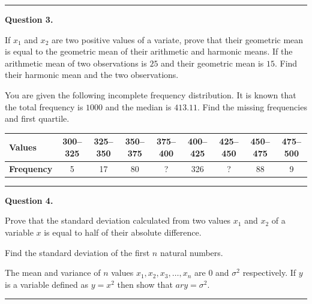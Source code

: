 \documentclass[11pt,a4paper]{article}
\begin{document}
\medskip\rule{\linewidth}{0.2pt}\medskip




\noindent   \textbf{Question 3.}

\begin{parts}
  \item If $x_1$ and $x_2$ are two positive values of a variate, prove that their geometric mean is equal to the geometric mean of their arithmetic and harmonic means. If the arithmetic mean of two observations is $25$ and their geometric mean is $15$. Find their harmonic mean and the two observations.

  \item You are given the following incomplete frequency distribution. It is known that the total frequency is $1000$ and the median is $413.11$. Find the missing frequencies and first quartile.
  
\begin{center}
  \small
  
\begin{tabular}{|l|c|c|c|c|c|c|c|c|}
    \hline
   \textbf{Values} & 300--325 & 325--350 & 350--375 & 375--400 & 400--425 & 425--450 & 450--475 & 475--500 \\ \hline
   \textbf{Frequency} & 5 & 17 & 80 & ? & 326 & ? & 88 & 9 \\ \hline
  \end{tabular}
  \end{center}
\end{parts}

\medskip\rule{\linewidth}{0.2pt}\medskip




\noindent   \textbf{Question 4.}

\begin{parts}
  \item Prove that the standard deviation calculated from two values $x_1$ and $x_2$ of a variable $x$ is equal to half of their absolute difference.

  \item Find the standard deviation of the first $n$ natural numbers.

  \item The mean and variance of $n$ values $x_1, x_2, x_3, \dots, x_n$ are $0$ and $\sigma^2$ respectively. If $y$ is a variable defined as $y = x^2$ then show that $ar{y} = \sigma^2$.
\end{parts}

\medskip\rule{\linewidth}{0.2pt}\medskip
\end{document}
